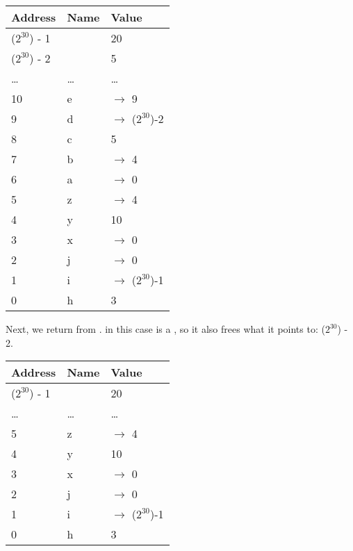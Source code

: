 \begin{table}[H]
  \begin{tabular}{|l|l|l|}
    \hline
    \textbf{Address} & \textbf{Name} & \textbf{Value} \\
    \hline
    ($2^{30}$) - 1 & & 20 \\
    \hline
    ($2^{30}$) - 2 & & 5 \\
    \hline
    \ldots & \ldots & \ldots \\
    \hline
    10 & e & $\rightarrow$ 9 \\
    \hline
    9 & d & $\rightarrow$ ($2^{30}$)-2 \\
    \hline
    8 & c & 5 \\
    \hline
    7 & b & $\rightarrow$ 4 \\
    \hline
    6 & a & $\rightarrow$ 0 \\
    \hline
    5 & z & $\rightarrow$ 4 \\
    \hline
    4 & y & 10 \\
    \hline
    3 & x & $\rightarrow$ 0 \\
    \hline
    2 & j & $\rightarrow$ 0 \\
    \hline
    1 & i & $\rightarrow$ ($2^{30}$)-1 \\
    \hline
    0 & h & 3 \\
    \hline
  \end{tabular}
\end{table}

Next, we return from .  in this case is a , so it also frees what it points to: ($2^{30}$) - 2.

\begin{table}[H]
  \begin{tabular}{|l|l|l|}
    \hline
    \textbf{Address} & \textbf{Name} & \textbf{Value} \\
    \hline
    ($2^{30}$) - 1 & & 20 \\
    \hline
    \ldots & \ldots & \ldots \\
    \hline
    5 & z & $\rightarrow$ 4 \\
    \hline
    4 & y & 10 \\
    \hline
    3 & x & $\rightarrow$ 0 \\
    \hline
    2 & j & $\rightarrow$ 0 \\
    \hline
    1 & i & $\rightarrow$ ($2^{30}$)-1 \\
    \hline
    0 & h & 3 \\
    \hline
  \end{tabular}
\end{table}

